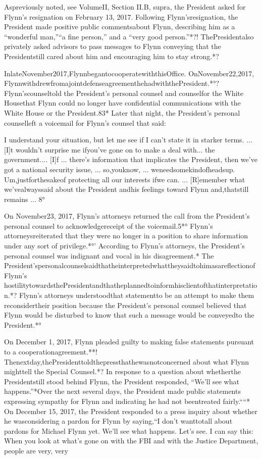 Aspreviously noted, see VolumeII, Section II.B, supra, the President asked for Flynn’s resignation on February 13, 2017. Following Flynn’sresignation, the President made positive public commentsabout Flynn, describing him as a “wonderful man,”“a fine person,” and a “very good person.”*?! ThePresidentalso privately asked advisors to pass messages to Flynn conveying that the Presidentstill cared about him and encouraging him to stay strong.*?

InlateNovember2017,FlynnbegantocooperatewiththisOffice. OnNovember22,2017, FlynnwithdrewfromajointdefenseagreementhehadwiththePresident.*°? Flynn’scounseltold the President’s personal counsel and counselfor the White Housethat Flynn could no longer have confidential communications with the White House or the President.83* Later that night, the President’s personal counselleft a voicemail for Flynn’s counsel that said:

I understand your situation, but let me see if I can’t state it in starker terms. ... [I]t wouldn’t surprise me ifyou’ve gone on to make a deal with... the government.... [I]f ... there’s information that implicates the President, then we’ve got a national security issue, ... so,youknow, ... weneedsomekindofheadsup. Um,justforthesakeof protecting all our interests ifwe can. ... [R]emember what we’vealwayssaid about the
President andhis feelings toward Flynn and,thatstill remains ... 8°

On November23, 2017, Flynn’s attorneys returned the call from the President’s personal counsel to acknowledgereceipt of the voicemail.5*° Flynn’s attorneysreiterated that they were no longer in a position to share information under any sort of privilege.*°’ According to Flynn’s attorneys, the President’s personal counsel was indignant and vocal in his disagreement.* The President’spersonalcounselsaidthatheinterpretedwhattheysaidtohimasareflectionofFlynn’s hostilitytowardsthePresidentandthatheplannedtoinformhisclientofthatinterpretation.*? Flynn’s attorneys understoodthat statementto be an attempt to make them reconsidertheir position because the President’s personal counsel believed that Flynn would be disturbed to know that such a message would be conveyedto the President.*°

On December 1, 2017, Flynn pleaded guilty to making false statements pursuant to a cooperationagreement.**! Thenextday,thePresidenttoldthepressthathewasnotconcerned about what Flynn mighttell the Special Counsel.*? In response to a question about whetherthe Presidentstill stood behind Flynn, the President responded, “We’ll see what happens.”*Over the next several days, the President made public statements expressing sympathy for Flynn and indicating he had not beentreated fairly.““* On December 15, 2017, the President responded to a press inquiry about whether he wasconsidering a pardon for Flynn by saying,“I don’t wanttotall about pardons for Michael Flynn yet. We’ll see what happens. Let’s see. I can say this: When you look at what’s gone on with the FBI and with the Justice Department, people are very, very

